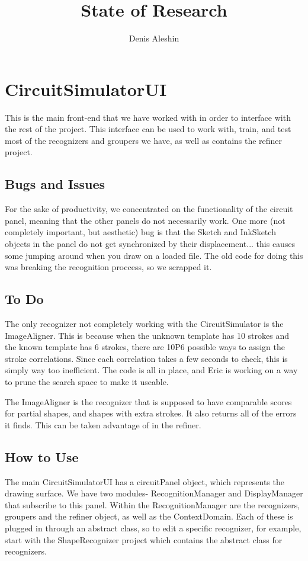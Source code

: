 \documentclass{article}
\title{State of Research}
\author{Denis Aleshin}
\begin{document}
\maketitle

\section{CircuitSimulatorUI}
This is the main front-end that we have worked with in order to interface with the rest of the project. This interface can be used to work with, train, and test most of the recognizers and groupers we have, as well as contains the refiner project.
\subsection{Bugs and Issues}
For the sake of productivity, we concentrated on the functionality of the circuit panel, meaning that the other panels do not necessarily work. One more (not completely important, but aesthetic) bug is that the Sketch and InkSketch objects in the panel do not get synchronized by their displacement... this causes some jumping around when you draw on a loaded file. The old code for doing this was breaking the recognition proccess, so we scrapped it.
\subsection{To Do}
The only recognizer not completely working with the CircuitSimulator is the ImageAligner. This is because when the unknown template has 10 strokes and the known template has 6 strokes, there are 10P6 possible ways to assign the stroke correlations. Since each correlation takes a few seconds to check, this is simply way too inefficient. The code is all in place, and Eric is working on a way to prune the search space to make it useable.

The ImageAligner is the recognizer that is supposed to have comparable scores for partial shapes, and shapes with extra strokes. It also returns all of the errors it finds. This can be taken advantage of in the refiner.
\subsection{How to Use}
The main CircuitSimulatorUI has a circuitPanel object, which represents the drawing surface. We have two modules- RecognitionManager and DisplayManager that subscribe to this panel. Within the RecognitionManager are the recognizers, groupers and the refiner object, as well as the ContextDomain. Each of these is plugged in through an abstract class, so to edit a specific recognizer, for example, start with the ShapeRecognizer project which contains the abstract class for recognizers.
\end{document}
